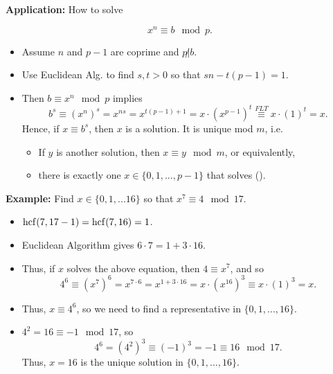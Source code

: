 \documentclass[11pt,dvipsnames]{book}
\def\hcf{{\rm hcf}}
\numberwithin{equation}{section} %
\numberwithin{figure}{section} %
\numberwithin{table}{section} %
\begin{document}
\begin{exercise}
{\bf Application:}   How to solve

\begin{equation}
x^{n}\equiv b\mod p.
\end{equation} 
 
\begin{itemize}
\item {\color{magenta} Assume $n$ and $p-1$ are coprime and $p\not |b$.} 
\item Use Euclidean Alg. to find $s,t>0$ so that $sn-t(p-1)=1$.  
\item Then $b\equiv x^{n}\mod p$ implies 
\[
b^{s}\equiv (x^{n})^{s} 
 = x^{ns} 
  =x^{t(p-1)+1}  
  = x\cdot (x^{p-1})^{t} 
\stackrel{FLT}{\equiv} x\cdot (1)^{t}  
= x.\] 
Hence, if $x\equiv b^{s}$, then $x$ is a solution. It is unique mod $m$, i.e.  

\begin{itemize}
\item If $y$ is another solution, then $x\equiv y\mod m$, or equivalently, 
\item there is exactly one $x\in \{0,1,...,p-1\}$ that solves  (\theequation). 
\end{itemize}
\end{itemize}






{\bf Example:}   Find $x\in\{0,1,...16\}$ so that $ x^{7}\equiv 4\mod 17$.  

\vspace{10pt}

\begin{itemize}
\item $\hcf(7,17-1)=\hcf(7,16)=1$.  
\item Euclidean Algorithm gives $6\cdot 7=1+3\cdot 16$.  
\item Thus, if $x$ solves the above equation, then $4\equiv x^{7}$,   and so
\[
4^{6}\equiv (x^{7})^{6}  
= x^{7\cdot 6}  
= x^{1+3\cdot 16} 
 = x\cdot (x^{16})^{3} 
  \equiv x\cdot (1)^{3} 
   = x.
\] 
\item Thus, $x\equiv 4^{6}$,   so we need to find a representative in $\{0,1,...,16\}$.  
\item $4^{2}=16\equiv -1\mod 17$,  so 
\[
4^{6}=(4^{2})^{3} 
\equiv (-1)^{3} 
=-1\equiv 16\mod 17. 
\] 
Thus, $x=16$ is the unique solution in $\{0,1,...,16\}$. 
\end{itemize}








\end{exercise}
\end{document}
